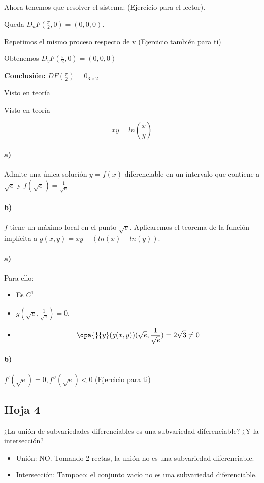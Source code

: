 \begin{problem}[19]
Ahora tenemos que resolver el sistema:
(Ejercicio para el lector). 

Queda $D_uF(\frac{\pi}{2},0)  = (0,0,0)$.

Repetimos el mismo proceso respecto de v (Ejercicio también para ti)

Obtenemos $D_vF(\frac{\pi}{2},0)  = (0,0,0)$

\textbf{Conclusión:} $DF(\frac{\pi}{2}) = 0_{3\times 2}$
\end{problem}

 \begin{problem}[20]
 \solution
 Visto en teoría
 \end{problem}
 
  \begin{problem}[21]
 \solution
 Visto en teoría
 \end{problem}
 
 
\begin{problem}[24]
\[xy = ln\left(\frac{x}{y}\right)\]
\paragraph{a)} Admite una única solución $y=f(x)$ diferenciable en un intervalo que contiene a $\sqrt{e}$ y $f(\sqrt{e}) = \frac{1}{\sqrt{e}}$
\paragraph{b)} $f$ tiene un máximo local en el punto $\sqrt{e}$.
\solution
Aplicaremos el teorema de la función implícita a $g(x,y)=xy-\left(ln(x)-ln(y)\right)$.
\paragraph{a)}
Para ello:
\begin{itemize}
\item Es $C^1$
\item $g(\sqrt{e},\frac{1}{\sqrt{e}}) = 0$.
\item
\[\dpa{}{y}(g(x,y)) (\sqrt{e},\frac{1}{\sqrt{e}}) = 2\sqrt{3}\neq 0\]
\end{itemize}

\paragraph{b)}
$f'(\sqrt{e}) = 0, f''(\sqrt{e})<0$ (Ejercicio para ti)
\end{problem}


\subsection{Hoja 4}
\begin{problem} [1]
¿La unión de subvariedades diferenciables es una subvariedad diferenciable? ¿Y la intersección?
\solution
\begin{itemize}
\item Unión: NO. Tomando 2 rectas, la unión no es una subvariedad diferenciable.
\item Intersección: Tampoco: el conjunto vacío no es una subvariedad diferenciable.
\end{itemize}
\end{problem}

